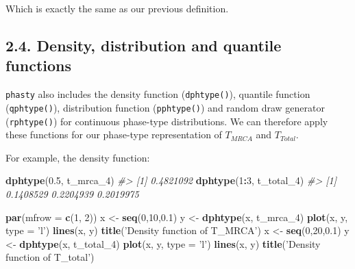 \documentclass[]{article}
\newenvironment{Shaded}{\begin{snugshade}}{\end{snugshade}}
\newcommand{\CommentTok}[1]{\textcolor[rgb]{0.56,0.35,0.01}{\textit{#1}}}
\newcommand{\DataTypeTok}[1]{\textcolor[rgb]{0.13,0.29,0.53}{#1}}
\newcommand{\DecValTok}[1]{\textcolor[rgb]{0.00,0.00,0.81}{#1}}
\newcommand{\FloatTok}[1]{\textcolor[rgb]{0.00,0.00,0.81}{#1}}
\newcommand{\KeywordTok}[1]{\textcolor[rgb]{0.13,0.29,0.53}{\textbf{#1}}}
\newcommand{\NormalTok}[1]{#1}
\newcommand{\OperatorTok}[1]{\textcolor[rgb]{0.81,0.36,0.00}{\textbf{#1}}}
\newcommand{\StringTok}[1]{\textcolor[rgb]{0.31,0.60,0.02}{#1}}
\begin{document}
Which is exactly the same as our previous definition.

\hypertarget{density-distribution-and-quantile-functions}{%
\subsection{2.4. Density, distribution and quantile
functions}\label{density-distribution-and-quantile-functions}}

\texttt{phasty} also includes the density function (\texttt{dphtype()}),
quantile function (\texttt{qphtype()}), distribution function
(\texttt{pphtype()}) and random draw generator (\texttt{rphtype()}) for
continuous phase-type distributions. We can therefore apply these
functions for our phase-type representation of \(T_{MRCA}\) and
\(T_{Total}\).

For example, the density function:

\begin{Shaded}
\begin{Highlighting}[]
\KeywordTok{dphtype}\NormalTok{(}\FloatTok{0.5}\NormalTok{, t_mrca_}\DecValTok{4}\NormalTok{)}
\CommentTok{#> [1] 0.4821092}
\KeywordTok{dphtype}\NormalTok{(}\DecValTok{1}\OperatorTok{:}\DecValTok{3}\NormalTok{, t_total_}\DecValTok{4}\NormalTok{)}
\CommentTok{#> [1] 0.1408529 0.2204939 0.2019975}
\end{Highlighting}
\end{Shaded}

\begin{Shaded}
\begin{Highlighting}[]
\KeywordTok{par}\NormalTok{(}\DataTypeTok{mfrow =} \KeywordTok{c}\NormalTok{(}\DecValTok{1}\NormalTok{, }\DecValTok{2}\NormalTok{))}
\NormalTok{x <-}\StringTok{ }\KeywordTok{seq}\NormalTok{(}\DecValTok{0}\NormalTok{,}\DecValTok{10}\NormalTok{,}\FloatTok{0.1}\NormalTok{)}
\NormalTok{y <-}\StringTok{ }\KeywordTok{dphtype}\NormalTok{(x, t_mrca_}\DecValTok{4}\NormalTok{)}
\KeywordTok{plot}\NormalTok{(x, y, }\DataTypeTok{type =} \StringTok{'l'}\NormalTok{)}
\KeywordTok{lines}\NormalTok{(x, y)}
\KeywordTok{title}\NormalTok{(}\StringTok{'Density function of T_MRCA'}\NormalTok{)}
\NormalTok{x <-}\StringTok{ }\KeywordTok{seq}\NormalTok{(}\DecValTok{0}\NormalTok{,}\DecValTok{20}\NormalTok{,}\FloatTok{0.1}\NormalTok{)}
\NormalTok{y <-}\StringTok{ }\KeywordTok{dphtype}\NormalTok{(x, t_total_}\DecValTok{4}\NormalTok{)}
\KeywordTok{plot}\NormalTok{(x, y, }\DataTypeTok{type =} \StringTok{'l'}\NormalTok{)}
\KeywordTok{lines}\NormalTok{(x, y)}
\KeywordTok{title}\NormalTok{(}\StringTok{'Density function of T_total'}\NormalTok{)}
\end{Highlighting}
\end{Shaded}
\end{document}
